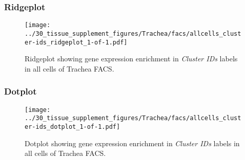 \clearpage

\subsubsection{Ridgeplot}
\begin{figure}[h]
\centering
\texttt{[image: ../30\_tissue\_supplement\_figures/Trachea/facs/allcells\_cluster-ids\_ridgeplot\_1-of-1.pdf]}

\caption{ Ridgeplot  showing gene expression enrichment in \emph{Cluster IDs} labels in all cells of Trachea FACS. }
\end{figure}


\clearpage

\subsubsection{Dotplot}
\begin{figure}[h]
\centering
\texttt{[image: ../30\_tissue\_supplement\_figures/Trachea/facs/allcells\_cluster-ids\_dotplot\_1-of-1.pdf]}

\caption{ Dotplot  showing gene expression enrichment in \emph{Cluster IDs} labels in all cells of Trachea FACS. }
\end{figure}

